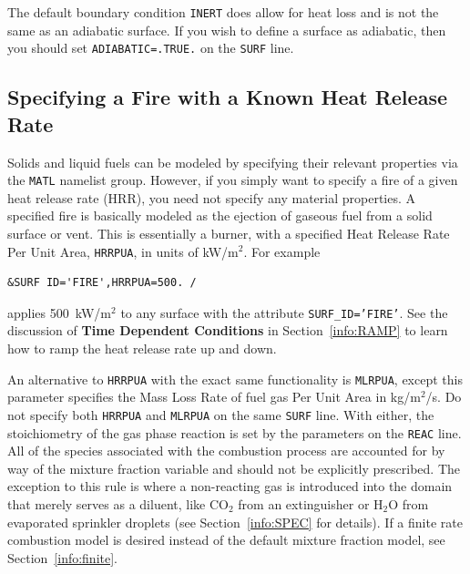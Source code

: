 \documentclass[11pt]{book}
\newcommand{\ct}{\tt\small}
\begin{document}
\begin{notebox}
\noindent
The default boundary condition {\ct INERT} does allow for heat loss and is not the same as an adiabatic surface.
If you wish to define a surface as adiabatic, then you should set {\ct ADIABATIC=.TRUE.} on the {\ct SURF} line.
\end{notebox}


\subsection{Specifying a Fire with a Known Heat Release Rate}
 

Solids and liquid fuels can be modeled by specifying their relevant
properties via the {\ct MATL} namelist group. However, if you simply
want to specify a fire of a given heat release rate (HRR),
you need not specify any material properties. A specified fire is
basically modeled as the ejection of gaseous fuel
from a solid surface or vent. This is essentially a burner, with a
specified Heat Release Rate Per Unit Area, {\ct HRRPUA}, in units of
kW/m$^2$. For example

\footnotesize
\begin{verbatim}
&SURF ID='FIRE',HRRPUA=500. /
\end{verbatim}
\normalsize

\noindent
applies 500~kW/m$^2$ to any surface with the attribute
{\ct SURF\_ID='FIRE'}. See the discussion of {\bf Time Dependent Conditions}
in Section~\ref{info:RAMP} to learn how to ramp the heat release rate up and down.

An alternative to {\ct HRRPUA} with the exact same functionality is
{\ct MLRPUA}, except this parameter 
specifies the Mass Loss Rate of fuel gas Per Unit Area in kg/m$^2$/s. Do not specify both
{\ct HRRPUA} and {\ct MLRPUA} on the same {\ct SURF} line. With either,
the stoichiometry of the gas phase reaction is set by the
parameters on the {\ct REAC} line. All of the
species associated with the combustion process are accounted for
by way of the mixture fraction variable and should not be
explicitly prescribed. The exception to this rule is
where a non-reacting gas is introduced into the domain that merely serves
as a diluent, like CO$_2$ from an extinguisher or H$_2$O from evaporated
sprinkler droplets (see Section~\ref{info:SPEC} for details).
If a finite rate combustion model is desired instead of the default mixture
fraction model, see Section~\ref{info:finite}.
\end{document}
